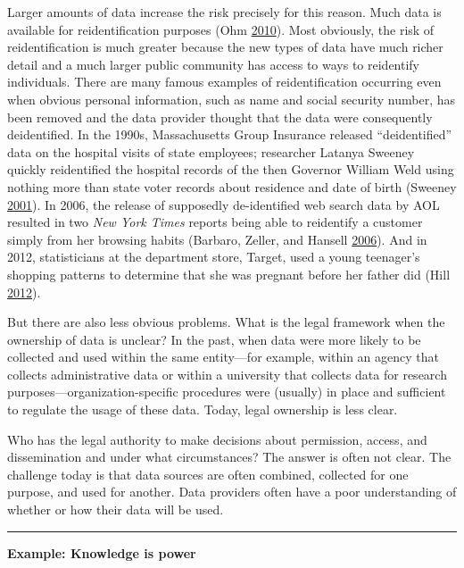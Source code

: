 \documentclass[]{krantz}
\begin{document}
Larger amounts of data increase the risk precisely for this reason. Much
data is available for reidentification purposes (Ohm
\protect\hyperlink{ref-ohm2010broken}{2010}). Most obviously, the risk
of reidentification is much greater because the new types of data have
much richer detail and a much larger public community has access to ways
to reidentify individuals. There are many famous examples of
reidentification occurring even when obvious personal information, such
as name and social security number, has been removed and the data
provider thought that the data were consequently deidentified. In the
1990s, Massachusetts Group Insurance released ``deidentified'' data on
the hospital visits of state employees; researcher Latanya Sweeney
quickly reidentified the hospital records of the then Governor William
Weld using nothing more than state voter records about residence and
date of birth (Sweeney
\protect\hyperlink{ref-sweeney2001computational}{2001}). In 2006, the
release of supposedly de-identified web search data by AOL resulted in
two \emph{New York Times} reports being able to reidentify a customer
simply from her browsing habits (Barbaro, Zeller, and Hansell
\protect\hyperlink{ref-barbaro2006face}{2006}). And in 2012,
statisticians at the department store, Target, used a young teenager's
shopping patterns to determine that she was pregnant before her father
did (Hill \protect\hyperlink{ref-hill2012target}{2012}).

But there are also less obvious problems. What is the legal framework
when the ownership of data is unclear? In the past, when data were more
likely to be collected and used within the same entity---for example,
within an agency that collects administrative data or within a
university that collects data for research
purposes---organization-specific procedures were (usually) in place and
sufficient to regulate the usage of these data. Today, legal ownership
is less clear.

Who has the legal authority to make decisions about permission, access,
and dissemination and under what circumstances? The answer is often not
clear. The challenge today is that data sources are often combined,
collected for one purpose, and used for another. Data providers often
have a poor understanding of whether or how their data will be used.

\begin{center}\rule{0.5\linewidth}{\linethickness}\end{center}

\textbf{Example: Knowledge is power}
\end{document}
